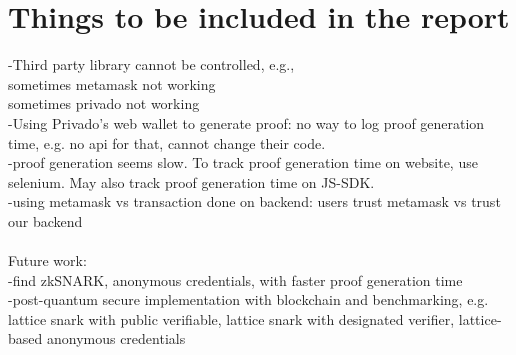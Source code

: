 \documentclass[12pt]{article}
\date{13th Dec 2024}
\theoremstyle{definition}
\begin{document}

\tableofcontents
\newpage
\section{Things to be included in the report} \label{Introduction}
-Third party library cannot be controlled, e.g., \\
sometimes metamask not working\\
sometimes privado not working\\
-Using Privado's web wallet to generate proof: no way to log proof generation time, e.g. no api for that, cannot change their code.\\
-proof generation seems slow. To track proof generation time on website, use selenium. May also track proof generation time on JS-SDK.\\
-using metamask vs transaction done on backend: users trust metamask vs trust our backend\\
\\
Future work:\\
-find zkSNARK, anonymous credentials, with faster proof generation time\\
-post-quantum secure implementation with blockchain and benchmarking, e.g. lattice snark with public verifiable, lattice snark with designated verifier, lattice-based anonymous credentials\\
\end{document}
